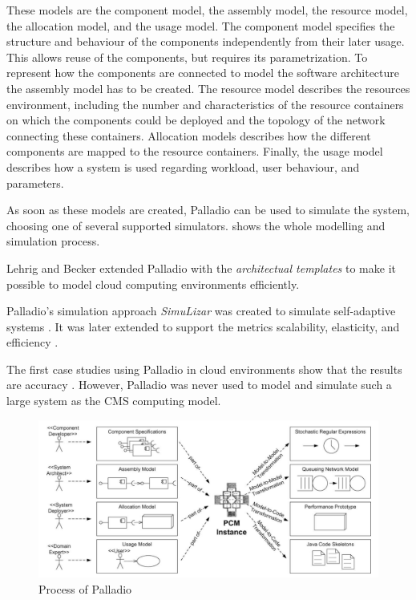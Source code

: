 These models are the component model, the assembly model, the resource model, the allocation model, and the usage model.
The component model specifies the structure and behaviour of the components independently from their later usage. This allows reuse of the components,  but requires its parametrization.
To represent how the components are connected to model the software architecture the assembly model has to be created. 
The resource model describes the resources environment, including the number and characteristics of the resource containers on which the components could be deployed and the topology of the network connecting these containers.
Allocation models describes how the different components are mapped to the resource containers.
Finally, the usage model describes how a system is used regarding workload, user behaviour, and parameters.

As soon as these models are created, Palladio can be used to simulate the system, choosing one of several supported simulators.  shows the whole modelling and simulation process. 

Lehrig and Becker \cite{arch} extended Palladio with the \textit{architectual templates} to make it possible to model cloud computing environments efficiently.

Palladio's simulation approach \textit{SimuLizar} was created to simulate self-adaptive systems \cite{becker2013simulizar}.
It was later extended to support the metrics scalability, elasticity, and efficiency \cite{arch}.

The first case studies using Palladio in cloud environments show that the results are accuracy \cite{arch}. However, Palladio was never used to model and simulate such a large system as the CMS computing model.

\begin{figure}
	\centering
	\includegraphics[width=0.95\linewidth]{images/palladio}
	\caption[]{Process of Palladio \cite{BECKER20093}}
	\label{fig:palladio}
\end{figure}



